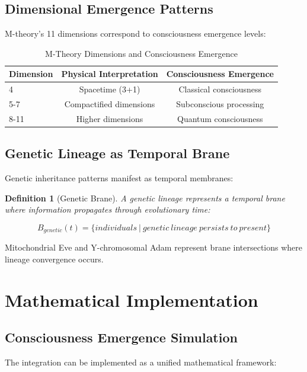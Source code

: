 \documentclass[12pt]{article}
\newtheorem{definition}{Definition}
\begin{document}
\subsection{Dimensional Emergence Patterns}

M-theory's 11 dimensions correspond to consciousness emergence levels:

\begin{table}[H]
\centering
\caption{M-Theory Dimensions and Consciousness Emergence}
\label{tab:m_theory_dimensions}
\begin{tabular}{@{}lcc@{}}
\toprule
Dimension & Physical Interpretation & Consciousness Emergence \\
\midrule
4 & Spacetime (3+1) & Classical consciousness \\
5-7 & Compactified dimensions & Subconscious processing \\
8-11 & Higher dimensions & Quantum consciousness \\
\bottomrule
\end{tabular}
\end{table}

\subsection{Genetic Lineage as Temporal Brane}

Genetic inheritance patterns manifest as temporal membranes:

\begin{definition}[Genetic Brane]
A genetic lineage represents a temporal brane where information propagates through evolutionary time:

\[B_{genetic}(t) = \{individuals\ |\ genetic\ lineage\ persists\ to\ present\}\]
\end{definition}

Mitochondrial Eve and Y-chromosomal Adam represent brane intersections where lineage convergence occurs.

\section{Mathematical Implementation}

\subsection{Consciousness Emergence Simulation}

The integration can be implemented as a unified mathematical framework:
\end{document}
